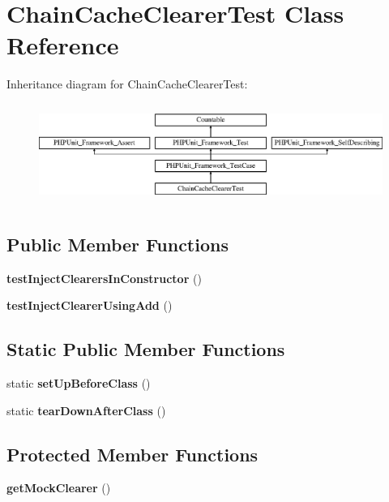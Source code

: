 \section{Chain\+Cache\+Clearer\+Test Class Reference}
\label{class_symfony_1_1_component_1_1_http_kernel_1_1_tests_1_1_cache_clearer_1_1_chain_cache_clearer_test}
Inheritance diagram for Chain\+Cache\+Clearer\+Test\+:\begin{figure}[H]
\begin{center}
\leavevmode
\includegraphics[height=3.303835cm]{class_symfony_1_1_component_1_1_http_kernel_1_1_tests_1_1_cache_clearer_1_1_chain_cache_clearer_test}
\end{center}
\end{figure}
\subsection*{Public Member Functions}
\begin{DoxyCompactItemize}
\item 
{\bf test\+Inject\+Clearers\+In\+Constructor} ()
\item 
{\bf test\+Inject\+Clearer\+Using\+Add} ()
\end{DoxyCompactItemize}
\subsection*{Static Public Member Functions}
\begin{DoxyCompactItemize}
\item 
static {\bf set\+Up\+Before\+Class} ()
\item 
static {\bf tear\+Down\+After\+Class} ()
\end{DoxyCompactItemize}
\subsection*{Protected Member Functions}
\begin{DoxyCompactItemize}
\item 
{\bf get\+Mock\+Clearer} ()
\end{DoxyCompactItemize}
